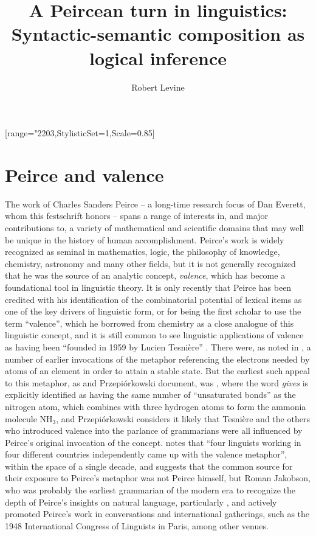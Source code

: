 \documentclass[output=paper,colorlinks,citecolor=brown]{langscibook}
\title{A Peircean turn in linguistics: Syntactic-semantic composition as logical inference}
\author{Robert Levine\affiliation{Ohio State University}}
\begin{document}
[range={"2203},StylisticSet=1,Scale=0.85]
\maketitle
\providecommand{\SetInfLen}{\relax}


\section{Peirce and valence}

The work of Charles Sanders Peirce -- a long-time research focus of Dan
Everett, whom this festschrift honors -- spans a range of interests in,
and major contributions to, a variety of mathematical and scientific
domains that may well be unique in the history of human
accomplishment. Peirce's work is widely recognized as seminal in
mathematics, logic, the philosophy of knowledge, chemistry, astronomy
and many other fields, but it is not generally recognized that he was
the source of an analytic concept, \emph{valence}, which has become
a foundational tool in linguistic theory. It is only recently that
Peirce has been credited with his identification of the
combinatorial potential of lexical items as one of the key drivers of
linguistic form, or for being the first scholar to use the term
``valence'', which he borrowed from chemistry as a close analogue of
this linguistic concept, and it is still common to see linguistic
applications of valence as having been ``founded in 1959 by Lucien
Tesnière'' \citep{hollein2022}. There were, as noted in \citet{AdamP-Peirce}, a
number of earlier invocations of the metaphor referencing the
electrons needed by atoms of an element in order to attain a stable
state. But the earliest such appeal to this metaphor, as \citet{askedal91}
and Przepi\'{o}rkowski document, was \citet{peirce1897}, where the word
\textit{gives} is explicitly identified as having the same number of
``unsaturated bonds'' as the nitrogen atom, which combines with three
hydrogen atoms to form the ammonia molecule NH$_3$, and
Przepi{\'o}rkowski considers it likely that Tesnière and the
others who introduced valence into the parlance of grammarians were
all influenced by Peirce's original invocation of the
concept. \citet[155]{AdamP-Peirce} notes that ``four linguists working
in four different countries independently came up with the valence
metaphor'', within the space of a single decade, and suggests that the
common source for their exposure to Peirce's metaphor was not Peirce
himself, but Roman Jakobson, who was probably the earliest
grammarian of the modern era to recognize the depth of Peirce's
insights on natural language, particularly \citet{peirce1897}, and actively
promoted Peirce's work in conversations and international gatherings,
such as the 1948 International Congress of Linguists in Paris, among
other venues.
\end{document}
